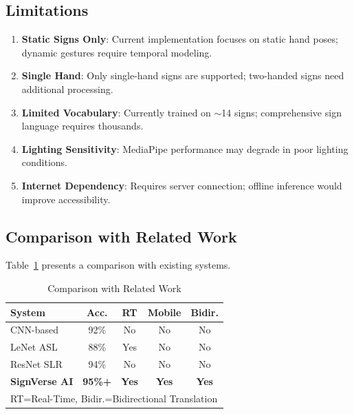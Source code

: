 \documentclass[conference]{IEEEtran}
\begin{document}
\subsection{Limitations}

\begin{enumerate}
    \item \textbf{Static Signs Only}: Current implementation focuses on static hand poses; dynamic gestures require temporal modeling.
    \item \textbf{Single Hand}: Only single-hand signs are supported; two-handed signs need additional processing.
    \item \textbf{Limited Vocabulary}: Currently trained on $\sim$14 signs; comprehensive sign language requires thousands.
    \item \textbf{Lighting Sensitivity}: MediaPipe performance may degrade in poor lighting conditions.
    \item \textbf{Internet Dependency}: Requires server connection; offline inference would improve accessibility.
\end{enumerate}

\subsection{Comparison with Related Work}

Table~\ref{tab:comparison} presents a comparison with existing systems.

\begin{table}[htbp]
\caption{Comparison with Related Work}
\label{tab:comparison}
\centering
\begin{tabular}{|l|c|c|c|c|}
\hline
\textbf{System} & \textbf{Acc.} & \textbf{RT} & \textbf{Mobile} & \textbf{Bidir.} \\
\hline
CNN-based \cite{koller2016} & 92\% & No & No & No \\
LeNet ASL \cite{ameen2017} & 88\% & Yes & No & No \\
ResNet SLR \cite{huang2018} & 94\% & No & No & No \\
\textbf{SignVerse AI} & \textbf{95\%+} & \textbf{Yes} & \textbf{Yes} & \textbf{Yes} \\
\hline
\multicolumn{5}{l}{\footnotesize RT=Real-Time, Bidir.=Bidirectional Translation} \\
\end{tabular}
\end{table}

\end{document}
